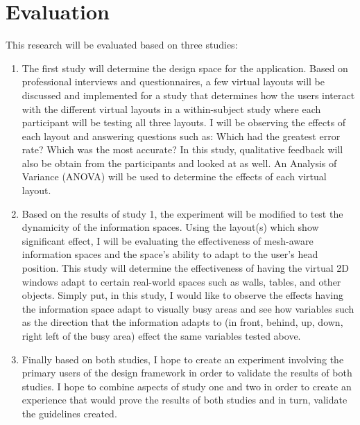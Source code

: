 \section{Evaluation}
\label{sec:evaluation}
This research will be evaluated based on three studies:
\begin{enumerate}
\item The first study will determine the design space for the application. Based on professional interviews and questionnaires, a few virtual layouts will be discussed and implemented for a study that determines how the users interact with the different virtual layouts in a within-subject study where each participant will be testing all three layouts. I will be observing the effects of each layout and answering questions such as: Which had the greatest error rate? Which was the most accurate? In this study, qualitative feedback will also be obtain from the participants and looked at as well. An Analysis of Variance (ANOVA) will be used to determine the effects of each virtual layout.

\item Based on the results of study 1, the experiment will be modified to test the dynamicity of the information spaces. Using the layout(s) which show significant effect, I will be evaluating the effectiveness of mesh-aware information spaces and the space's ability to adapt to the user's head position. This study will determine the effectiveness of having the virtual 2D windows adapt to certain real-world spaces such as walls, tables, and other objects. Simply put, in this study, I would like to observe the effects having the information space adapt to visually busy areas and see how variables such as the direction that the information adapts to (in front, behind, up, down, right left of the busy area) effect the same variables tested above.

\item Finally based on both studies, I hope to create an experiment involving the primary users of the design framework in order to validate the results of both studies. I hope to combine aspects of study one and two in order to create an experience that would prove the results of both studies and in turn, validate the guidelines created.
\end{enumerate}